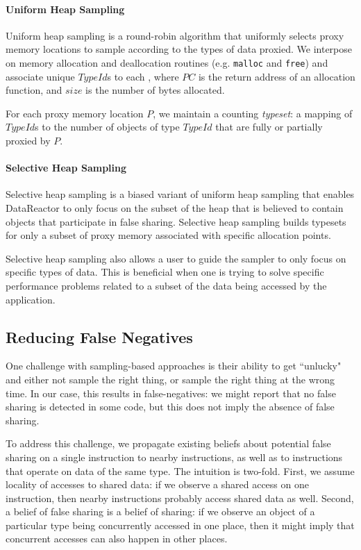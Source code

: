 \documentclass{sig-alternate}
\newcommand{\Toolname}{DataReactor}
\begin{document}
\newcommand\TypeId{$TypeId$}

\paragraph{Uniform Heap Sampling}
Uniform heap sampling is a round-robin algorithm that uniformly selects proxy memory locations to sample according to
the types of data proxied. We interpose on memory allocation and deallocation routines (e.g. \texttt{malloc} and \texttt{free})
and associate unique \TypeId{}s to each \TypeIdPair{}, where $PC$ is the return address of an allocation function, and $size$ is the
number of bytes allocated.

For each proxy memory location $P$, we maintain a counting \emph{typeset}: a mapping of \TypeId{}s to the number of objects of type
\TypeId{} that are fully or partially proxied by $P$.

\paragraph{Selective Heap Sampling}
Selective heap sampling is a biased variant of uniform heap sampling that enables \Toolname{} to only focus on the subset
of the heap that is believed to contain objects that participate in false sharing. Selective heap sampling builds typesets
for only a subset of proxy memory associated with specific allocation points.

Selective heap sampling also allows a user to guide the sampler to only focus on specific types of data. This is beneficial
when one is trying to solve specific performance problems related to a subset of the data being accessed by the application.

\subsection{Reducing False Negatives}\label{sec:falsenegs}

One challenge with sampling-based approaches is their ability to get ``unlucky" and either not sample
the right thing, or sample the right thing at the wrong time. In our case, this results in false-negatives:
we might report that no false sharing is detected in some code, but this does not imply the absence of
false sharing.

To address this challenge, we propagate existing beliefs about potential false sharing on a single instruction
to nearby instructions, as well as to instructions that operate on data of the same type. The intuition is
two-fold. First, we assume locality of accesses to shared data: if we observe a shared access on one instruction,
then nearby instructions probably access shared data as well. Second, a belief of false sharing is a belief of
sharing: if we observe an object of a particular type being concurrently accessed in one place, then it might
imply that concurrent accesses can also happen in other places.
\end{document}
